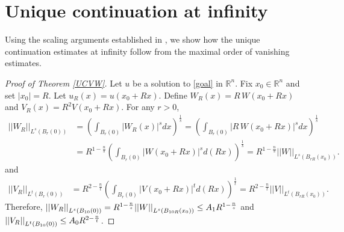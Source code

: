 \documentclass[11pt]{amsart}
\theoremstyle{plain}
\numberwithin{equation}{section}
\begin{document}
\section{Unique continuation at infinity}
\label{QuantUC}

Using the scaling arguments established in \cite{BK05}, we show how the unique continuation estimates at infinity follow from the maximal order of vanishing estimates.

\begin{proof}[Proof of Theorem \ref{UCVW}]
Let $u$ be a solution to \eqref{goal} in ${\ensuremath{\mathbb{R}}}^n$.
Fix $x_0 \in {\ensuremath{\mathbb{R}}}^n$ and set ${\left\vert{x_0}\right\vert} = R$.
Let $u_R(x) = u(x_0 + Rx)$. 
Define $W_R{\left( {x} \right) } = R \, W{\left( {x_0 + R x} \right) }$ and $V_R{\left( {x} \right) } = R^2 V{\left( {x_0 + R x} \right) }$.
For any $r > 0$,
\begin{align*}
{\left\vert\left\vert {W_R}\right\vert\right\vert}_{L^s{\left( {B_r{\left( {0} \right) }} \right) }}
&= {\left( {\int_{B_r{\left( {0} \right) }} {\left\vert{W_R{\left( {x} \right) }}\right\vert}^s dx} \right) }^{\frac 1 s}
= {\left( {\int_{B_r{\left( {0} \right) }} {\left\vert{R \, W{\left( {x_0 + R x} \right) }}\right\vert}^s dx} \right) }^{\frac 1 s} \\
&= R^{1 - \frac n s } {\left( {  \int_{B_r{\left( {0} \right) }} {\left\vert{W{\left( {x_0 + R x} \right) }}\right\vert}^s d{\left( {Rx} \right) } } \right) }^{\frac 1 s}
= R^{1 - \frac n s } {\left\vert\left\vert {W}\right\vert\right\vert}_{L^s{\left( {B_{r R}{\left( {x_0} \right) }} \right) }}.
\end{align*}
and
\begin{align*}
{\left\vert\left\vert {V_R}\right\vert\right\vert}_{L^t{\left( {B_r{\left( {0} \right) }} \right) }}
&= R^{2 - \frac n t } {\left( {  \int_{B_r{\left( {0} \right) }} {\left\vert{V{\left( {x_0 + R x} \right) }}\right\vert}^t d{\left( {Rx} \right) } } \right) }^{\frac 1 t}
= R^{2 - \frac n t } {\left\vert\left\vert {V}\right\vert\right\vert}_{L^t{\left( {B_{r R}{\left( {x_0} \right) }} \right) }}.
\end{align*}
Therefore, ${\displaystyle} {\left\vert\left\vert {W_R}\right\vert\right\vert}_{L^s{\left( {B_{10}{\left( {0} \right) }} \right) }} = R^{1 - \frac n s} {\left\vert\left\vert {W}\right\vert\right\vert}_{L^s{\left( {B_{10R}{\left( {x_0} \right) }} \right) }} \le A_1 R^{1 - \frac n s}$ and ${\displaystyle} {\left\vert\left\vert {V_R}\right\vert\right\vert}_{L^t{\left( {B_{10}{\left( {0} \right) }} \right) }} \le A_0 R^{2 - \frac n t}$.

\end{proof}
\end{document}
